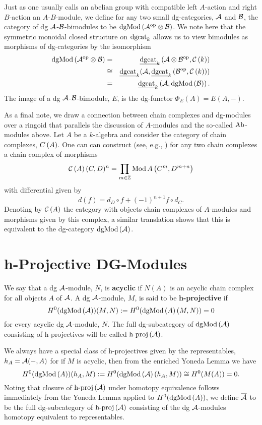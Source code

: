Just as one usually calls an abelian group with compatible left $A$-action and right $B$-action an $A$-$B$-module, we define for any two small dg-categories, \(\mathcal{A}\) and \(\mathcal{B}\), the category of dg \(\mathcal{A}\)-\(\mathcal{B}\)-bimodules to be \(\operatorname{dgMod}\left(\mathcal{A}^{{\operatorname{op}}} \otimes \mathcal{B}\right)\).
We note here that the symmetric monoidal closed structure on \(\operatorname{dgcat}_k\) allows us to view bimodules as morphisms of dg-categories by the isomorphism
\begin{eqnarray*}
  \operatorname{dgMod}\left(\mathcal{A}^{{\operatorname{op}}} \otimes \mathcal{B}\right) &=& \underline{\operatorname{dgcat}}_{k}\left(\mathcal{A} \otimes \mathcal{B}^{{\operatorname{op}}}, \mathcal{C}\left(k\right)\right)\\
  &\cong& \underline{\operatorname{dgcat}}_{k}(\mathcal{A}, \underline{\operatorname{dgcat}}_{k}\left(\mathcal{B}^{{\operatorname{op}}}, \mathcal{C}\left(k\right)\right))\\
  &=& \underline{\operatorname{dgcat}}_{k}\left(\mathcal{A}, \operatorname{dgMod}\left(\mathcal{B}\right)\right).
\end{eqnarray*}
The image of a dg \(\mathcal{A}\)-\(\mathcal{B}\)-bimodule, \(E\), is the dg-functor \(\Phi_E(A) = E(A,-)\).

As a final note, we draw a connection between chain complexes and dg-modules over a ringoid that parallels the discussion of $A$-modules and the so-called $\operatorname{Ab}$-modules above.
Let $A$ be a $k$-algebra and consider the category of chain complexes, $C\left(A\right)$.
One can can construct (see, e.g., \parencite{Weibel94}) for any two chain complexes a chain complex of morphisms
\[\mathcal{C}\left(A\right)(C,D)^n = \prod_{m \in \mathbb{Z}}\operatorname{Mod}A\left(C^m, D^{m + n}\right)\]
with differential given by
\[d(f) = d_D \circ f + (-1)^{n+1} f \circ d_C.\]
Denoting by $\mathcal{C}\left(A\right)$ the category with objects chain complexes of $A$-modules and morphisms given by this complex, a similar translation shows that this is equivalent to the dg-category $\operatorname{dgMod}\left(\mathcal{A}\right)$.

\section{h-Projective DG-Modules}
We say that a dg \(\mathcal{A}\)-module, \(N\), is \textbf{acyclic} if \(N(A)\) is an acyclic chain complex for all objects \(A\) of \(\mathcal{A}\).
A dg \(\mathcal{A}\)-module, \(M\), is said to be \textbf{h-projective} if
\[H^0(\operatorname{dgMod}\left(\mathcal{A}\right))(M,N) := H^0(\operatorname{dgMod}\left(A\right)(M,N)) = 0\]
for every acyclic dg \(\mathcal{A}\)-module, \(N\).
The full dg-subcategory of \(\operatorname{dgMod}\left(\mathcal{A}\right)\) consisting of h-projectives will be called \(\operatorname{h-proj}\left(\mathcal{A}\right)\).

We always have a special class of h-projectives given by the representables, \(h_A = \mathcal{A}(-, A)\) for if \(M\) is acyclic, then from the enriched Yoneda Lemma we have
\[H^0(\operatorname{dgMod}\left(A\right))(h_A,M) := H^0(\operatorname{dgMod}\left(\mathcal{A}\right)(h_A, M)) \cong H^0(M(A)) = 0.\]
Noting that closure of \(\operatorname{h-proj}\left(\mathcal{A}\right)\) under homotopy equivalence follows immediately from the Yoneda Lemma applied to \(H^0(\operatorname{dgMod}\left(A\right))\), we define \(\overline{\mathcal{A}}\) to be the full dg-subcategory of \(\operatorname{h-proj}\left(\mathcal{A}\right)\) consisting of the dg \(\mathcal{A}\)-modules homotopy equivalent to representables.

